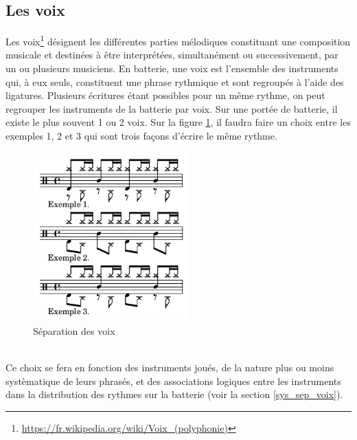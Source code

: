 \subsection*{Les voix}
Les voix\footnote{\url{https://fr.wikipedia.org/wiki/Voix_(polyphonie)}} désignent les différentes parties mélodiques constituant une composition musicale et destinées à être interprétées, simultanément ou successivement, par un ou plusieurs musiciens. En batterie, une voix est l’ensemble des instruments qui, à eux seuls, constituent une phrase rythmique et sont regroupés à l’aide des ligatures. Plusieurs écritures étant possibles pour un même rythme, on peut regrouper les instruments de la batterie par voix. Sur une portée de batterie, il existe le plus souvent 1 ou 2 voix. Sur la figure \ref{sep_voix}, il faudra faire un choix entre les exemples 1, 2 et 3 qui sont trois façons d’écrire le même rythme.
\begin{figure}[h]
	\centering
	\includegraphics[height=65mm, width=60mm]{z_images/3_methodes/0_notation_de_la_batterie/7_voix.png}
	\caption{Séparation des voix}
	\label{sep_voix}
\end{figure}\\
Ce choix se fera en fonction des instruments joués, de la nature plus ou moins systèmatique de leurs phrasés, et des associations logiques entre les instruments dans la distribution des rythmes sur la batterie (voir la section \ref{sys_sep_voix}).
